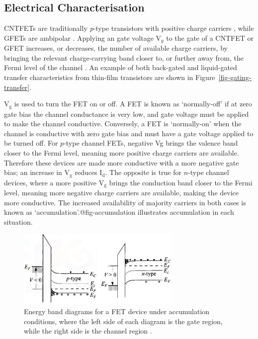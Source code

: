 \documentclass[
  a4paper,
]{scrbook}
\begin{document}
\hypertarget{electrical-characterisation}{%
\subsection{Electrical
Characterisation}\label{electrical-characterisation}}

CNTFETs are traditionally \emph{p}-type transistors with positive charge
carriers \autocite{Martel1998,Kong2000}, while GFETs are ambipolar
\autocite{Ohno2010a}. Applying an gate voltage V\(_g\) to the gate of a
CNTFET or GFET increases, or decreases, the number of available charge
carriers, by bringing the relevant charge-carrying band closer to, or
further away from, the Fermi level of the channel \autocite{Sze2006}. An
example of both back-gated and liquid-gated transfer characteristics
from thin-film transistors are shown in
Figure~\ref{fig-gating-transfer}.

V\(_\textrm{g}\) is used to turn the FET on or off. A FET is known as
`normally-off' if at zero gate bias the channel conductance is very low,
and gate voltage must be applied to make the channel conductive.
Conversely, a FET is `normally-on' when the channel is conductive with
zero gate bias and must have a gate voltage applied to be turned off.
For \(p\)-type channel FETs, negative Vg brings the valence band closer
to the Fermi level, meaning more positive charge carriers are available.
Therefore these devices are made more conductive with a more negative
gate bias; an increase in V\(_\textrm{g}\) reduces I\(_\textrm{d}\). The
opposite is true for \(n\)-type channel devices, where a more positive
V\(_\textrm{g}\) brings the conduction band closer to the Fermi level,
meaning more negative charge carriers are available, making the device
more conductive. The increased availability of majority carriers in both
cases is known as `accumulation'.@fig-accumulation illustrates
accumulation in each situation.

\begin{figure}

{\centering \includegraphics[width=0.7\textwidth,height=\textheight]{figures/ch2/accumulation.png}

}

\caption{\label{fig-accumulation}Energy band diagrams for a FET device
under accumulation conditions, where the left side of each diagram is
the gate region, while the right side is the channel region
\autocite{Sze2006}.}

\end{figure}
\end{document}
